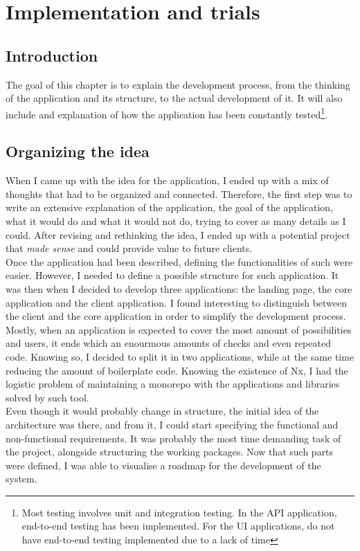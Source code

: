 \documentclass[a4paper, 12pt, oneside]{book}
\begin{document}
\chapter{Implementation and trials}
\section{Introduction}
The goal of this chapter is to explain the development process, from the thinking of the application and its structure, to the actual development of it. It will also include and explanation of how the application has been constantly tested\footnote{Most testing involves unit and integration testing. In the API application, end-to-end testing has been implemented. For the UI applications, do not have end-to-end testing implemented due to a lack of time}.
\section{Organizing the idea}
When I came up with the idea for the application, I ended up with a mix of thoughts that had to be organized and connected. Therefore, the first step was to write an extensive explanation of the application, the goal of the application, what it would do and what it would not do, trying to cover as many details as I could. After revising and rethinking the idea, I ended up with a potential project that \emph{made sense} and could provide value to future clients.
\\[8pt]
Once the application had been described, defining the functionalities of such were easier. However, I needed to define a possible structure for such application. It was then when I decided to develop three applications: the landing page, the core application and the client application. I found interesting to distinguish between the client and the core application in order to simplify the development process. Mostly, when an application is expected to cover the most amount of possibilities and users, it ends which an enourmous amounts of checks and even repeated code. Knowing so, I decided to split it in two applications, while at the same time reducing the amount of boilerplate code. Knowing the existence of Nx, I had the logistic problem of maintaining a monorepo with the applications and libraries solved by such tool.
\\[8pt]
Even though it would probably change in structure, the initial idea of the architecture was there, and from it, I could start specifying the functional and non-functional requirements. It was probably the most time demanding task of the project, alongside structuring the working packages. Now that such parts were defined, I was able to visualise a roadmap for the development of the system.
\end{document}
